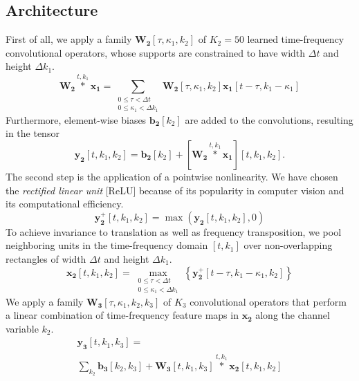 \documentclass{article}
\begin{document}
\subsection{Architecture}
First of all, we apply a family $\boldsymbol{W_2}[\tau,\kappa_1,k_2]$ of $K_2=50$ learned time-frequency convolutional operators, whose supports are constrained to have width $\Delta t$ and height $\Delta k_1$. 
\begin{equation}
\boldsymbol{W_2}
\overset{t,k_1}{\ast}
\boldsymbol{x_1}
=
\! \!
\sum_{\substack{
0 \leq \tau < \Delta t \\
0 \leq \kappa_1 < \Delta k_1}}
\! \! \! \! \!
\boldsymbol{W_2}[\tau,\kappa_1,k_2]
\boldsymbol{x_1}[t-\tau,k_1-\kappa_1]
\end{equation}
Furthermore, element-wise biases $\boldsymbol{b_2}[k_2]$ are added to the convolutions, resulting in the tensor 
\begin{equation}
\boldsymbol{y_2}[t,k_1,k_2] =
\boldsymbol{b_2}[k_2] + 
[\boldsymbol{W_2}
\overset{t,k_1}{\ast}
\boldsymbol{x_1}][t,k_1,k_2].
\end{equation}
The second step is the application of a pointwise nonlinearity. We have chosen the \emph{rectified linear unit} [ReLU] because of its popularity in computer vision and its computational efficiency.
 \begin{equation}
 \boldsymbol{y_{2}^{+}}[t,k_1,k_2] = \max \left( \boldsymbol{y_2}[t,k_1,k_2], 0\right)
 \end{equation}
 To achieve invariance to translation as well as frequency transposition, we pool neighboring units in
 the time-frequency domain $[t,k_1]$ over non-overlapping rectangles of width $\Delta t$ and height $\Delta k_1$.
 \begin{equation}
 \boldsymbol{x_2}[t,k_1,k_2] = \! \!
 \max_{
\substack{
0 \leq \tau < \Delta t \\
0 \leq \kappa_1 < \Delta k_1}
 } \! \!
\left\{
 \boldsymbol{y_{2}^{+}}[t - \tau, k_1 - \kappa_1, k_2]
 \right\}
 \end{equation}
 We apply a family $\boldsymbol{W_3}[\tau, \kappa_1, k_2, k_3]$ of $K_3$ convolutional operators that perform a linear combination of time-frequency feature maps in $\boldsymbol{x_2}$ along the channel variable $k_2$.
 \begin{eqnarray}
 \boldsymbol{y_3}[t,k_1,k_3] =
 \qquad  \qquad  \qquad  \qquad  \qquad  \qquad  \qquad \nonumber
 \\
 \sum_{k_2}
 \boldsymbol{b_3}[k_2, k_3]
 + \boldsymbol{W_3}[t,k_1,k_3]
 \overset{t,k_1}{\ast}
 \boldsymbol{x_2}[t,k_1,k_2]
 \end{eqnarray}
\end{document}
